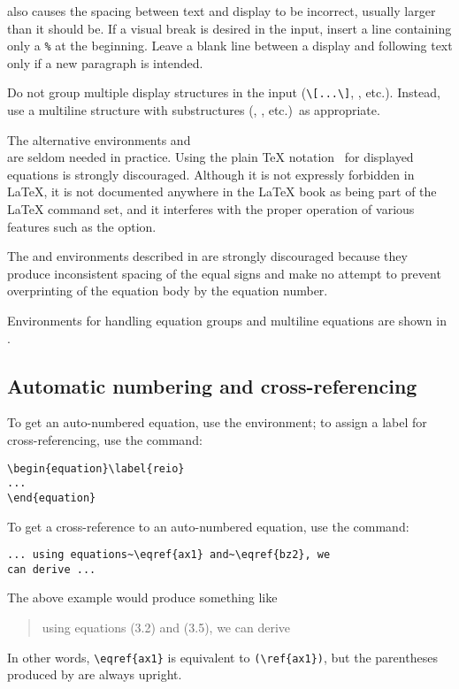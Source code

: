 \begin{center}
\begin{notes}
  also causes the spacing between text and display to be incorrect,
  usually larger than it should be.
  If a visual break is desired in the input, insert a line containing
  only a \verb+%+ at the beginning.
  Leave a blank line between a display and following text only if a new
  paragraph is intended.
\item Do not group multiple display structures in the input (\verb+\[...\]+,
  , etc.).  Instead, use a multiline structure with
  substructures (, , etc.)\ as appropriate.
\item The alternative environments  and\\
   are seldom needed in practice.  Using the plain
  \TeX{} notation \dbldollars\ for displayed equations is strongly
  discouraged. Although it is not expressly forbidden in \LaTeX{}, it
  is not documented anywhere in the \LaTeX{} book as being part of the
  \LaTeX{} command set, and it interferes with the proper operation of
  various features such as the  option.
\item The  and  environments described
  in \cite{lamport} are strongly discouraged because they produce
  inconsistent spacing of the equal signs and make no attempt to prevent
  overprinting of the equation body by the equation number.
\end{notes}
\end{center}
Environments for handling equation groups and multiline equations are
shown in .

\newpage

\subsection{Automatic numbering and cross-referencing}

To get an auto-numbered equation, use the  environment; to
assign a label for cross-referencing, use the  command:
\begin{verbatim}
\begin{equation}\label{reio}
...
\end{equation}
\end{verbatim}
To get a cross-reference to an auto-numbered equation, use the
 command:
\begin{verbatim}
... using equations~\eqref{ax1} and~\eqref{bz2}, we
can derive ...
\end{verbatim}
The above example would produce something like
\begin{quote}
  using equations (3.2) and (3.5), we can derive
\end{quote}
In other words, \verb'\eqref{ax1}' is equivalent to \verb'(\ref{ax1})',
but the parentheses produced by  are always upright.


